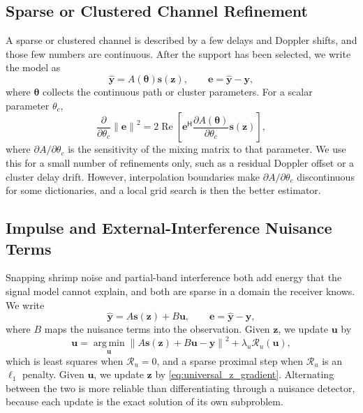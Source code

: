 \documentclass[11pt]{article}
\newcommand{\Hh}{^{\mathsf H}}
\newcommand{\norm}[1]{\left\lVert #1 \right\rVert}
\newcommand{\Ree}{\operatorname{Re}}
\newcommand{\argmin}{\operatorname*{arg\,min}}
\begin{document}
\subsection{Sparse or Clustered Channel Refinement}

A sparse or clustered channel is described by a few delays and Doppler shifts,
and those few numbers are continuous.  After the support has been selected, we
write the model as
\begin{equation}
  \widehat{\bm y}=A(\bm\theta)\bm s(\bm z),\qquad
  \bm e=\widehat{\bm y}-\bm y,
\end{equation}
where $\bm\theta$ collects the continuous path or cluster parameters.  For a
scalar parameter $\theta_c$,
\begin{equation}
  \frac{\partial}{\partial\theta_c}\norm{\bm e}^2
  =
  2\Ree\left[
    \bm e\Hh
    \frac{\partial A(\bm\theta)}{\partial\theta_c}
    \bm s(\bm z)
  \right],
  \label{eq:theta_gradient}
\end{equation}
where $\partial A/\partial\theta_c$ is the sensitivity of the mixing matrix to
that parameter.  We use this for a small number of refinements only, such as a
residual Doppler offset or a cluster delay drift.  However, interpolation
boundaries make $\partial A/\partial\theta_c$ discontinuous for some
dictionaries, and a local grid search is then the better estimator.

\subsection{Impulse and External-Interference Nuisance Terms}

Snapping shrimp noise and partial-band interference both add energy that the
signal model cannot explain, and both are sparse in a domain the receiver knows.
We write
\begin{equation}
  \widehat{\bm y}=A\bm s(\bm z)+B\bm u,\qquad
  \bm e=\widehat{\bm y}-\bm y,
\end{equation}
where $B$ maps the nuisance terms into the observation.  Given $\bm z$, we
update $\bm u$ by
\begin{equation}
  \bm u
  =
  \argmin_{\bm u}\norm{A\bm s(\bm z)+B\bm u-\bm y}^2
  +\lambda_u\mathcal R_u(\bm u),
\end{equation}
which is least squares when $\mathcal R_u=0$, and a sparse proximal step when
$\mathcal R_u$ is an $\ell_1$ penalty.  Given $\bm u$, we update $\bm z$ by
\eqref{eq:universal_z_gradient}.  Alternating between the two is more reliable
than differentiating through a nuisance detector, because each update is the
exact solution of its own subproblem.
\end{document}

